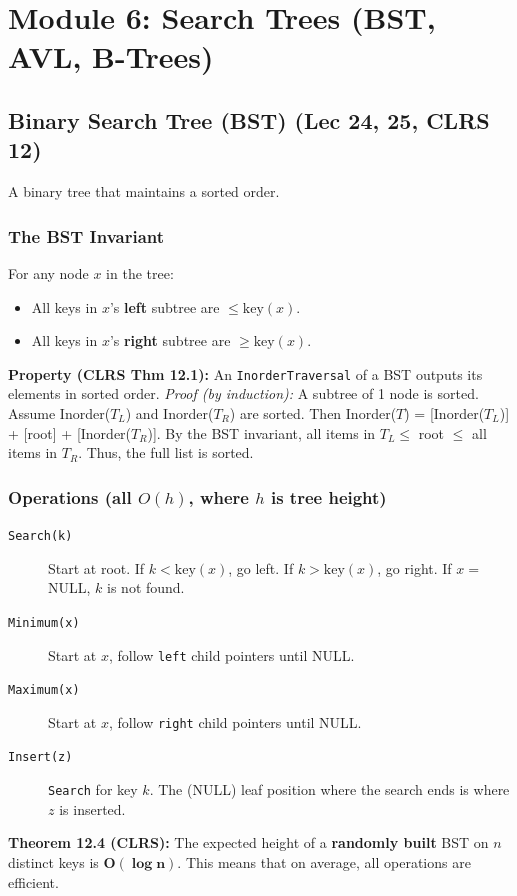 
\section{Module 6: Search Trees (BST, AVL, B-Trees)}

\subsection{Binary Search Tree (BST) (Lec 24, 25, CLRS 12)}
A binary tree that maintains a sorted order.

\subsubsection{The BST Invariant}
For any node $x$ in the tree:
\begin{itemize}
    \item All keys in $x$'s \textbf{left} subtree are $\le \text{key}(x)$.
    \item All keys in $x$'s \textbf{right} subtree are $\ge \text{key}(x)$.
\end{itemize}
\textbf{Property (CLRS Thm 12.1):} An \texttt{InorderTraversal} of a BST outputs its elements in sorted order.
\textit{Proof (by induction):} A subtree of 1 node is sorted. Assume Inorder($T_L$) and Inorder($T_R$) are sorted. Then Inorder($T$) = [Inorder($T_L$)] + [root] + [Inorder($T_R$)]. By the BST invariant, all items in $T_L \le$ root $\le$ all items in $T_R$. Thus, the full list is sorted.

\subsubsection{Operations (all $O(h)$, where $h$ is tree height)}
\begin{description}
    \item[\texttt{Search(k)}] Start at root. If $k < \text{key}(x)$, go left. If $k > \text{key}(x)$, go right. If $x=$ NULL, $k$ is not found.
    \item[\texttt{Minimum(x)}] Start at $x$, follow \texttt{left} child pointers until NULL.
    \item[\texttt{Maximum(x)}] Start at $x$, follow \texttt{right} child pointers until NULL.
    \item[\texttt{Insert(z)}] \texttt{Search} for key $k$. The (NULL) leaf position where the search ends is where $z$ is inserted.
\end{description}
\textbf{Theorem 12.4 (CLRS):} The expected height of a \textbf{randomly built} BST on $n$ distinct keys is $\mathbf{O(\log n)}$. This means that on average, all operations are efficient.

